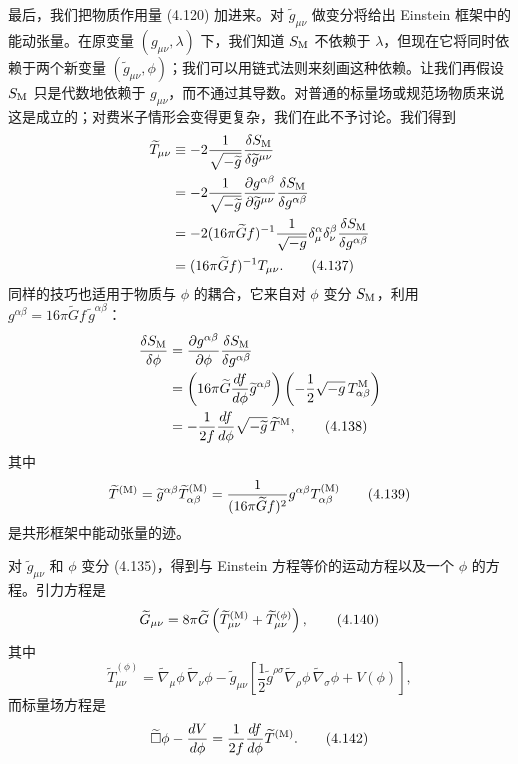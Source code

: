 最后，我们把物质作用量 (4.120) 加进来。对 $\widetilde{g}_{\mu\nu}$ 做变分将给出 Einstein 框架中的能动张量。在原变量 $(g_{\mu\nu}, \lambda)$ 下，我们知道 $S_{\rm M}$ 不依赖于 $\lambda$，但现在它将同时依赖于两个新变量 $(\widetilde{g}_{\mu\nu}, \phi)$；我们可以用链式法则来刻画这种依赖。让我们再假设 $S_{\rm M}$ 只是代数地依赖于 $g_{\mu\nu}$，而不通过其导数。对普通的标量场或规范场物质来说这是成立的；对费米子情形会变得更复杂，我们在此不予讨论。我们得到
\begin{align*}
\widetilde{T}_{\mu\nu} &\equiv -2\frac{1}{\sqrt{-\widetilde{g}}}\frac{\delta S_{\rm M}}{\delta\widetilde{g}^{\mu\nu}} \\
&= -2\frac{1}{\sqrt{-\widetilde{g}}}\frac{\partial g^{\alpha\beta}}{\partial\widetilde{g}^{\mu\nu}}\frac{\delta S_{\rm M}}{\delta g^{\alpha\beta}} \\
&= -2(16\pi\widetilde{G}f)^{-1}\frac{1}{\sqrt{-g}}\delta^\alpha_\mu\delta^\beta_\nu\frac{\delta S_{\rm M}}{\delta g^{\alpha\beta}} \\
&= (16\pi\widetilde{G}f)^{-1}T_{\mu\nu}.
\tag{4.137}
\end{align*}
同样的技巧也适用于物质与 $\phi$ 的耦合，它来自对 $\phi$ 变分 $S_{\rm M}$，利用 $g^{\alpha\beta} = 16\pi\widetilde{G}f\,\widetilde{g}^{\alpha\beta}$：
\begin{align*}
\frac{\delta S_{\rm M}}{\delta\phi} &= \frac{\partial g^{\alpha\beta}}{\partial\phi}\frac{\delta S_{\rm M}}{\delta g^{\alpha\beta}} \\
&= \left(16\pi\widetilde{G}\frac{df}{d\phi}\widetilde{g}^{\alpha\beta}\right)\left(-\frac{1}{2}\sqrt{-g}\,T^{\rm M}_{\alpha\beta}\right) \\
&= -\frac{1}{2f}\frac{df}{d\phi}\sqrt{-\widetilde{g}}\,\widetilde{T}^{\rm M},
\tag{4.138}
\end{align*}
其中
\begin{equation*}
\widetilde{T}^{({\rm M})} = \widetilde{g}^{\alpha\beta}\widetilde{T}^{({\rm M})}_{\alpha\beta} = \frac{1}{(16\pi\widetilde{G}f)^2}g^{\alpha\beta}T^{({\rm M})}_{\alpha\beta}
\tag{4.139}
\end{equation*}
是共形框架中能动张量的迹。

对 $\widetilde{g}_{\mu\nu}$ 和 $\phi$ 变分 (4.135)，得到与 Einstein 方程等价的运动方程以及一个 $\phi$ 的方程。引力方程是
\begin{equation*}
\widetilde{G}_{\mu\nu} = 8\pi\widetilde{G}\left(\widetilde{T}^{({\rm M})}_{\mu\nu} + \widetilde{T}^{(\phi)}_{\mu\nu}\right),
\tag{4.140}
\end{equation*}
其中
\begin{equation*}
\widetilde{T}^{(\phi)}_{\mu\nu} = \widetilde{\nabla}_\mu\phi\,\widetilde{\nabla}_\nu\phi - \widetilde{g}_{\mu\nu}\left[\frac{1}{2}\widetilde{g}^{\rho\sigma}\widetilde{\nabla}_\rho\phi\,\widetilde{\nabla}_\sigma\phi + V(\phi)\right],
\tag{4.141}
\end{equation*}
而标量场方程是
\begin{equation*}
\widetilde{\Box}\phi - \frac{dV}{d\phi} = \frac{1}{2f}\frac{df}{d\phi}\widetilde{T}^{({\rm M})}.
\tag{4.142}
\end{equation*}

